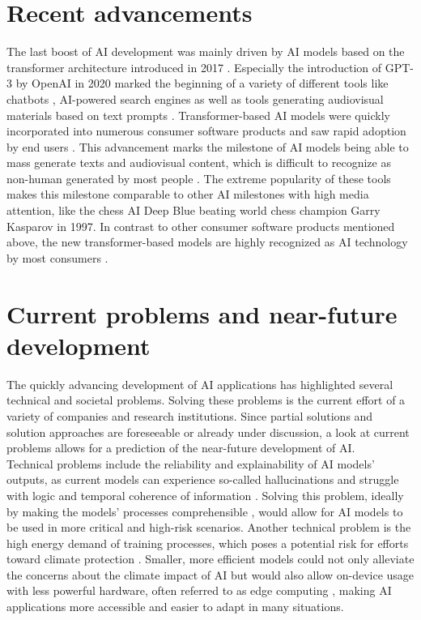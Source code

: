 \documentclass[a4paper, conference]{IEEEtran}
\begin{document}
\section{Recent advancements}
The last boost of AI development was mainly driven by AI models based on the transformer architecture introduced in 2017 \cite{transformer}. Especially the introduction of GPT-3 by OpenAI in 2020 \cite{brown2020language} marked the beginning of a variety of different tools like chatbots \cite{googleGemini, openAiChatGPT}, AI-powered search engines \cite{perplexity} as well as tools generating audiovisual materials based on text prompts \cite{midjourney, dalle}. Transformer-based AI models were quickly incorporated into numerous consumer software products and saw rapid adoption by end users \cite[pp. 437-451]{AiIndexReport24}. This advancement marks the milestone of AI models being able to mass generate texts and audiovisual content, which is difficult to recognize as non-human generated by most people \cite{frank2023representative}. The extreme popularity of these tools makes this milestone comparable to other AI milestones with high media attention, like the chess AI Deep Blue beating world chess champion Garry Kasparov in 1997. In contrast to other consumer software products mentioned above, the new transformer-based models are highly recognized as AI technology by most consumers \cite[pp. 33-37]{littman2022gathering}.\\

\section{Current problems and near-future development}
The quickly advancing development of AI applications has highlighted several technical and societal problems. Solving these problems is the current effort of a variety of companies and research institutions. Since partial solutions and solution approaches are foreseeable or already under discussion, a look at current problems allows for a prediction of the near-future development of AI.\\

Technical problems include the reliability and explainability of AI models' outputs, as current models can experience so-called hallucinations \cite{huang2023survey} and struggle with logic and temporal coherence of information \cite{chen2023learning}. Solving this problem, ideally by making the models' processes comprehensible \cite[pp. 1312-1315]{aiModernApproach}, would allow for AI models to be used in more critical and high-risk scenarios. Another technical problem is the high energy demand of training processes, which poses a potential risk for efforts toward climate protection \cite{Dhar2020}. Smaller, more efficient models could not only alleviate the concerns about the climate impact of AI but would also allow on-device usage with less powerful hardware, often referred to as edge computing \cite{AiEdge}, making AI applications more accessible and easier to adapt in many situations.\\
\end{document}
